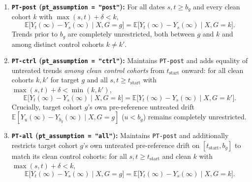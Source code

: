 \documentclass[11pt]{article}
\theoremstyle{definition}
\theoremstyle{remark}
\begin{document}
\begin{enumerate}
\item \textbf{\texttt{PT-post} (\texttt{pt\_assumption = "post"}):} For all dates $s, t \ge b_g$ and every clean cohort $k$ with $\max(s,t) + \delta < k$,
\[
\mathbb{E}\bigl[Y_t(\infty) - Y_s(\infty) \mid X, G = g\bigr] = \mathbb{E}\bigl[Y_t(\infty) - Y_s(\infty) \mid X, G = k\bigr].
\]
Trends prior to $b_g$ are completely unrestricted, both between $g$ and $k$ and among distinct control cohorts $k \neq k'$.

\item \textbf{\texttt{PT-ctrl} (\texttt{pt\_assumption = "ctrl"}):} Maintains \texttt{PT-post} and adds equality of untreated trends \emph{among clean control cohorts} from $t_{\mathrm{start}}$ onward: for all clean cohorts $k, k'$ for target $g$ and all $s, t \ge t_{\mathrm{start}}$ with $\max(s,t) + \delta < \min(k, k')$,
\[
\mathbb{E}\bigl[Y_t(\infty) - Y_s(\infty) \mid X, G = k\bigr] = \mathbb{E}\bigl[Y_t(\infty) - Y_s(\infty) \mid X, G = k'\bigr].
\]
Crucially, target cohort $g$'s own pre-reference untreated drift $\mathbb{E}[Y_u(\infty) - Y_{b_g}(\infty) \mid X, G = g]$ ($u < b_g$) remains completely unrestricted.

\item \textbf{\texttt{PT-all} (\texttt{pt\_assumption = "all"}):} Maintains \texttt{PT-post} and additionally restricts target cohort $g$'s own untreated pre-reference drift on $[t_{\mathrm{start}}, b_g]$ to match its clean control cohorts: for all $s, t \ge t_{\mathrm{start}}$ and clean $k$ with $\max(s,t) + \delta < k$,
\[
\mathbb{E}\bigl[Y_t(\infty) - Y_s(\infty) \mid X, G = g\bigr] = \mathbb{E}\bigl[Y_t(\infty) - Y_s(\infty) \mid X, G = k\bigr].
\]
\end{enumerate}
\end{document}

